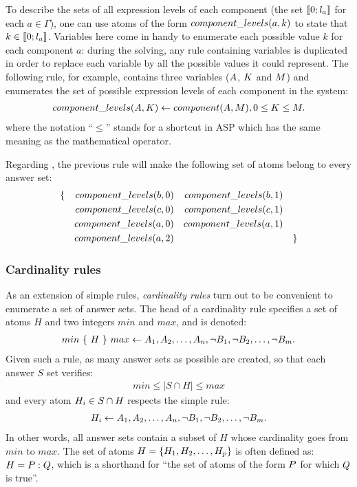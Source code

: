 To describe the sets of all expression levels of each component (\ie the set $\llbracket 0 ; l_a \rrbracket$ for each $a \in \Gamma$),
one can use atoms of the form $component\_levels(a, k)$ to state that $k \in \llbracket 0 ; l_a \rrbracket$.
Variables here come in handy to enumerate each possible value $k$ for each component $a$:
during the solving, any rule containing variables is duplicated in order to replace each variable by all the possible values it could represent.
The following rule, for example, contains three variables ($A$, $K$ and $M$) and enumerates the set of possible expression levels of each component in the system:
\begin{align*}
  component\_levels(A, K) \leftarrow component(A, M), 0 \leq K \leq M.
\end{align*}
where the notation “$\leq$” stands for a shortcut in ASP which has the same meaning as the mathematical operator.

\begin{example}
Regarding , the previous rule will make the following set of atoms belong to every answer set:
\begin{align*}
  &\{&component\_levels(b, 0)
  &&component\_levels(b, 1) \\
  &&component\_levels(c, 0)
  &&component\_levels(c, 1) \\
  &&component\_levels(a, 0)
  &&component\_levels(a, 1) \\
  &&component\_levels(a, 2) &&&&\}
\end{align*}
\end{example}

\subsubsection{Cardinality rules}
\label{sssec:cardinality_rules}
As an extension of simple rules, \emph{cardinality rules} turn out to be convenient to enumerate a set of answer sets.
The head of a cardinality rule specifies a set of atoms $H$ and two integers $min$ and $max$, and is denoted:
\begin{align*}
  min\ \{\ H\ \}\ max \leftarrow A_1, A_2, \dots, A_n, \neg B_1, \neg B_2, \dots, \neg B_m.
\end{align*}
Given such a rule, as many answer sets as possible are created, so that each answer $S$ set verifies:
\begin{align*}
  min \leq |S \cap H| \leq max
\end{align*}
and every atom $H_i \in S \cap H$ respects the simple rule:
\begin{align*}
  H_i \leftarrow A_1, A_2, \dots, A_n, \neg B_1, \neg B_2, \dots, \neg B_m.
\end{align*}
In other words, all answer sets contain a subset of $H$ whose cardinality goes from $min$ to $max$.
The set of atoms $H = \{ H_1, H_2, \dots, H_p \}$ is often defined as: $H = P : Q$,
which is a shorthand for “the set of atoms of the form $P$ for which $Q$ is true”.

